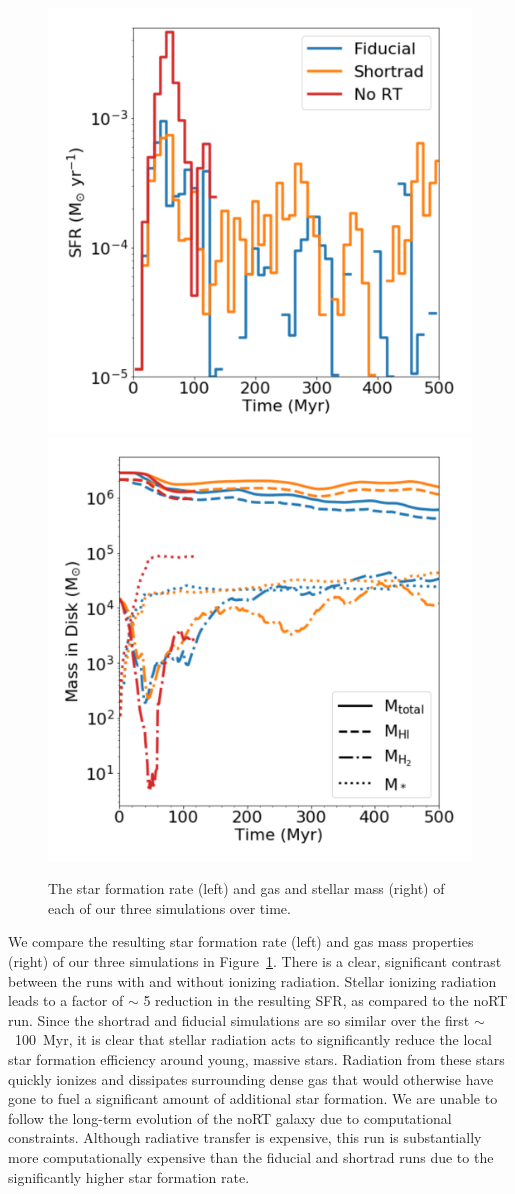 \documentclass[twocolumn]{aastex62}
\begin{document}
\begin{figure}
\centering
\includegraphics[width=0.49\linewidth]{sfr}
\includegraphics[width=0.49\linewidth]{mass}
\caption{The star formation rate (left) and gas and stellar mass (right) of each of our three simulations over time.}
\label{fig:sfr_mass_evolution}
\end{figure}

We compare the resulting star formation rate (left) and gas mass properties (right) of our three simulations in Figure~\ref{fig:sfr_mass_evolution}. There is a clear, significant contrast between the runs with and without ionizing radiation. Stellar ionizing radiation leads to a factor of $\sim$ 5 reduction in the resulting SFR, as compared to the noRT run. Since the shortrad and fiducial simulations are so similar over the first $\sim$~100~Myr, it is clear that stellar radiation acts to significantly reduce the local star formation efficiency around young, massive stars. Radiation from these stars quickly ionizes and dissipates surrounding dense gas that would otherwise have gone to fuel a significant amount of additional star formation. We are unable to follow the long-term evolution of the noRT galaxy due to computational constraints. Although radiative transfer is expensive, this run is substantially more computationally expensive than the fiducial and shortrad runs due to the significantly higher star formation rate.
\end{document}
